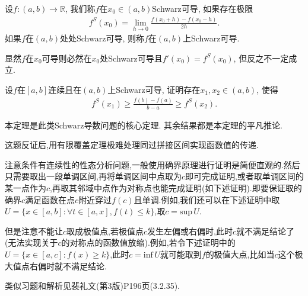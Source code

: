 \documentclass[../../main.tex]{subfiles}%
\begin{document}
\begin{definition}[Schwarz导数]\label{definition:Schwarz导数}
设$f:(a,b) \to \mathbb{R}$, 我们称$f$在$x_0 \in (a,b)$Schwarz可导, 如果存在极限
\begin{align}
f^S(x_0) = \lim_{h \to 0} \frac{f(x_0 + h) - f(x_0 - h)}{2h}. \label{eq:13.2348982334242te3fd938523i23903t3ger34t4234898938523i23903t3ger34t4106}
\end{align}
如果$f$在$(a,b)$处处Schwarz可导, 则称$f$在$(a,b)$上Schwarz可导.
\end{definition}
\begin{note}
显然$f$在$x_0$可导则必然在$x_0$处Schwarz可导且$f'(x_0) = f^S(x_0)$, 但反之不一定成立.
\end{note}

\begin{theorem}[Schwarz导数的Lagrange中值定理]\label{theorem:Schwarz导数的Lagrange中值定理}
设$f$在$[a,b]$连续且在$(a,b)$上Schwarz可导, 证明存在$x_1,x_2 \in (a,b)$, 使得
\begin{align}
f^S(x_1) \geqslant \frac{f(b) - f(a)}{b - a} \geqslant f^S(x_2). \label{eq:13.2348982334242te3fd938523i23903t3ger34t4234898938523i23903t3ger34t4107}
\end{align}
\end{theorem}
\begin{remark}
本定理是此类Schwarz导数问题的核心定理. 其余结果都是本定理的平凡推论.
\end{remark}
\begin{remark}
这题反证后,用有限覆盖定理极难处理同过拼接区间实现函数值的传递.

注意条件有连续性的性态分析问题,一般使用确界原理进行证明是简便直观的.然后只需要取出一段单调区间,再将单调区间中点取为$c$即可完成证明,或者取单调区间的某一点作为$c$,再取其邻域中点作为对称点也能完成证明(如下述证明).即要保证取的确界$c$满足函数在点$c$附近穿过$f(c)$且单调.例如,我们还可以在下述证明中取$U=\{x\in [a,b]:\forall t\in [a,x],f(t)\leqslant k\}$,取$c=\mathrm{sup}\,U$.

但是注意不能让$c$取成极值点,若极值点$c$发生左偏或右偏时,此时$c$就不满足结论了(无法实现关于$c$的对称点的函数值放缩).例如,若令下述证明中的$U=\{x\in [a,c]:f(x)\geqslant k\}$,此时$c=\mathrm{inf}\, U$就可能取到$f$的极值大点,比如当$c$这个极大值点右偏时就不满足结论.

类似习题和解析见裴礼文(第3版)P196页(3.2.35).
\end{remark}
\end{document}
